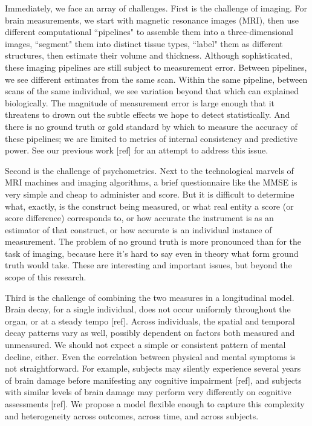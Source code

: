 \documentclass[12pt]{article}
\begin{document}
Immediately, we face an array of challenges. First is the challenge of imaging. For brain measurements, we start with magnetic resonance images (MRI), then use different computational ``pipelines" to assemble them into a three-dimensional images, ``segment" them into distinct tissue types, ``label" them as different structures, then estimate their volume and thickness. Although sophisticated, these imaging pipelines are still subject to measurement error. Between pipelines, we see different estimates from the same scan. Within the same pipeline, between scans of the same individual, we see variation beyond that which can explained biologically. The magnitude of measurement error is large enough that it threatens to drown out the subtle effects we hope to detect statistically. And there is no ground truth or gold standard by which to measure the accuracy of these pipelines; we are limited to metrics of internal consistency and predictive power. See our previous work {\color{teal}[ref]} for an attempt to address this issue.

Second is the challenge of psychometrics. Next to the technological marvels of MRI machines and imaging algorithms, a brief questionnaire like the MMSE is very simple and cheap to administer and score. But it is difficult to determine what, exactly, is the construct being measured, or what real entity a score (or score difference) corresponds to, or how accurate the instrument is as an estimator of that construct, or how accurate is an individual instance of measurement. The problem of no ground truth is more pronounced than for the task of imaging, because here it's hard to say even in theory what form ground truth would take. These are interesting and important issues, but beyond the scope of this research. 

Third is the challenge of combining the two measures in a longitudinal model. Brain decay, for a single individual, does not occur uniformly throughout the organ, or at a steady tempo {\color{teal}[ref]}. Across individuals, the spatial and temporal decay patterns vary as well, possibly dependent on factors both measured and unmeasured. We should not expect a simple or consistent pattern of mental decline, either. Even the correlation between physical and mental symptoms is not straightforward. For example, subjects may silently experience several years of brain damage before manifesting any cognitive impairment {\color{teal}[ref]}, and subjects with similar levels of brain damage may perform very differently on cognitive assessments {\color{teal}[ref]}. We propose a model flexible enough to capture this complexity and heterogeneity across outcomes, across time, and across subjects. 
\end{document}
